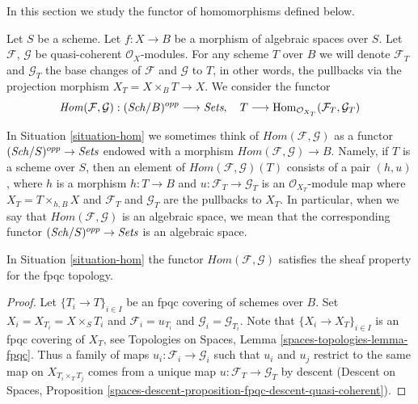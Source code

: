\noindent
In this section we study the functor of homomorphisms defined below.

\begin{situation}
\label{situation-hom}
Let $S$ be a scheme. Let $f : X \to B$ be a morphism of algebraic spaces
over $S$. Let $\mathcal{F}$, $\mathcal{G}$ be quasi-coherent
$\mathcal{O}_X$-modules. For any scheme $T$ over $B$ we will denote
$\mathcal{F}_T$ and $\mathcal{G}_T$ the base changes of
$\mathcal{F}$ and $\mathcal{G}$ to $T$, in other words, the pullbacks
via the projection morphism $X_T = X \times_B T \to X$.
We consider the functor
\begin{equation}
\label{equation-hom}
\mathit{Hom}(\mathcal{F}, \mathcal{G}) :
(\mathit{Sch}/B)^{opp}
\longrightarrow
\textit{Sets},\quad
T
\longrightarrow
\mathop{\mathrm{Hom}}\nolimits_{\mathcal{O}_{X_T}}(\mathcal{F}_T, \mathcal{G}_T)
\end{equation}
\end{situation}

\noindent
In Situation \ref{situation-hom} we sometimes think of
$\mathit{Hom}(\mathcal{F}, \mathcal{G})$ as a functor
$(\mathit{Sch}/S)^{opp} \to \textit{Sets}$
endowed with a morphism
$\mathit{Hom}(\mathcal{F}, \mathcal{G}) \to B$.
Namely, if $T$ is a scheme over $S$, then an element of
$\mathit{Hom}(\mathcal{F}, \mathcal{G})(T)$ consists of a pair
$(h, u)$, where $h$ is a morphism $h : T \to B$ and
$u : \mathcal{F}_T \to \mathcal{G}_T$ is an $\mathcal{O}_{X_T}$-module
map where $X_T = T \times_{h, B} X$ and $\mathcal{F}_T$ and $\mathcal{G}_T$
are the pullbacks to $X_T$. In particular, when we say
that $\mathit{Hom}(\mathcal{F}, \mathcal{G})$ is an algebraic space,
we mean that the corresponding functor
$(\mathit{Sch}/S)^{opp} \to \textit{Sets}$ is an algebraic space.

\begin{lemma}
\label{lemma-hom-sheaf}
In Situation \ref{situation-hom} the functor
$\mathit{Hom}(\mathcal{F}, \mathcal{G})$ 
satisfies the sheaf property for the fpqc topology.
\end{lemma}

\begin{proof}
Let $\{T_i \to T\}_{i \in I}$ be an fpqc covering of schemes over $B$.
Set $X_i = X_{T_i} = X \times_S T_i$ and $\mathcal{F}_i = u_{T_i}$
and $\mathcal{G}_i = \mathcal{G}_{T_i}$.
Note that $\{X_i \to X_T\}_{i \in I}$ is an fpqc covering of $X_T$, see
Topologies on Spaces, Lemma \ref{spaces-topologies-lemma-fpqc}.
Thus a family of maps $u_i : \mathcal{F}_i \to \mathcal{G}_i$
such that $u_i$ and $u_j$ restrict to the same map on
$X_{T_i \times_T T_j}$ comes from a unique map
$u : \mathcal{F}_T \to \mathcal{G}_T$ by descent
(Descent on Spaces, Proposition
\ref{spaces-descent-proposition-fpqc-descent-quasi-coherent}).
\end{proof}

